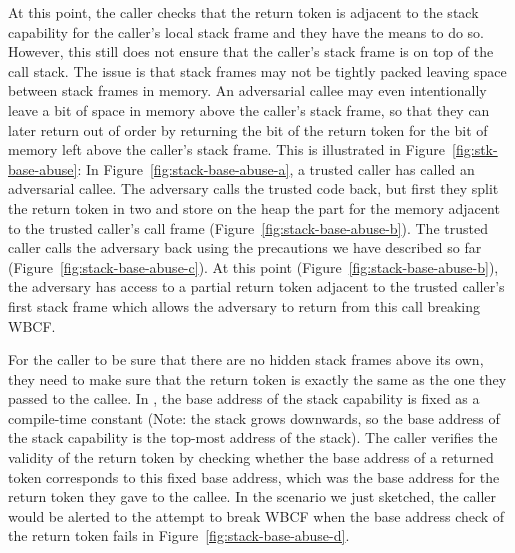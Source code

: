 \documentclass[acmsmall,screen]{acmart}\settopmatter{}
\begin{document}
At this point, the caller checks that the return token is adjacent to the stack capability for the caller's local stack frame and they have the means to do so.
However, this still does not ensure that the caller's stack frame is on top of the call stack.
The issue is that stack frames may not be tightly packed leaving space between stack frames in memory.
An adversarial callee may even intentionally leave a bit of space in memory above the caller's stack frame, so that they can later return out of order by returning the bit of the return token for the bit of memory left above the caller's stack frame.
This is illustrated in Figure~\ref{fig:stk-base-abuse}: In Figure~\ref{fig:stack-base-abuse-a}, a trusted caller has called an adversarial callee.
The adversary calls the trusted code back, but first they split the return token in two and store on the heap the part for the memory adjacent to the trusted caller's call frame (Figure~\ref{fig:stack-base-abuse-b}).
The trusted caller calls the adversary back using the precautions we have described so far (Figure~\ref{fig:stack-base-abuse-c}).
At this point (Figure~\ref{fig:stack-base-abuse-b}), the adversary has access to a partial return token adjacent to the trusted caller's first stack frame which allows the adversary to return from this call breaking WBCF.

For the caller to be sure that there are no hidden stack frames above its own, they need to make sure that the return token is exactly the same as the one they passed to the callee.
In \stktokens{}, the base address of the stack capability is fixed as a compile-time constant (Note: the stack grows downwards, so the base address of the stack capability is the top-most address of the stack). 
The caller verifies the validity of the return token by checking whether the base address of a returned token corresponds to this fixed base address, which was the base address for the return token they gave to the callee.
In the scenario we just sketched, the caller would be alerted to the attempt to break WBCF when the base address check of the return token fails in Figure~\ref{fig:stack-base-abuse-d}.
\end{document}
